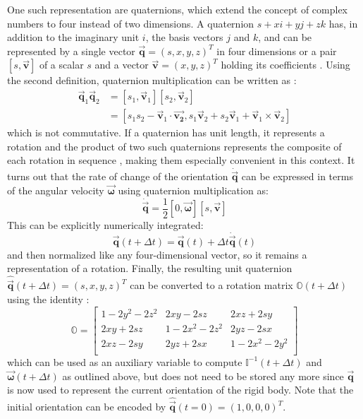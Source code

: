 \documentclass[oneside, a4paper]{book}
\newcommand\vek[1]{\vec{\bm{#1}}}
\newcommand\br[1]{\left(#1\right)}
\begin{document}
    One such representation are quaternions, which extend the concept of complex numbers to four instead of two dimensions. A quaternion $s + x i + y j + z k$ has, in addition to the imaginary unit $i$, the basis vectors $j$ and $k$, and can be represented by a single vector $\vek{q} = \br{s,x,y,z}^T$ in four dimensions or a pair $\left[s,\vek{v}\right]$ of a scalar $s$ and a vector $\vek{v}=\br{x,y,z}^T$ holding its coefficients \autocite{physically-based-rigids}. Using the second definition, quaternion multiplication can be written as \autocite{physically-based-rigids}:
    \begin{align}
      \vek{q}_1 \vek{q}_2 
      &= \left[s_1,\vek{v}_1\right] \left[s_2,\vek{v}_2\right] \\
      &= \left[s_1 s_2 - \vek{v}_1 \cdot \vek{v_2}, s_1\vek{v}_2 + s_2\vek{v}_1 + \vek{v}_1 \times \vek{v}_2 \right]
    \end{align}
    which is not commutative. If a quaternion has unit length, it represents a rotation and the product of two such quaternions represents the composite of each rotation in sequence \autocite{physically-based-rigids}, making them especially convenient in this context. It turns out that the rate of change of the orientation $\dot{\vek{q}}$ can be expressed in terms of the angular velocity $\vek{\omega}$ using quaternion multiplication as:
    \begin{equation}\label{eq:rigid-quaternion-qdot}
      \dot{\vek{q}} = \frac{1}{2} \left[0,\vek{\omega}\right]\left[s,\vek{v}\right] 
    \end{equation}
   This can be explicitly numerically integrated:
    \begin{equation}\label{eq:rigid-qdot-integration}
      \vek{q}\br{t+\Delta t} = \vek{q}\br{t} + \Delta t\dot{\vek{q}}\br{t}
    \end{equation}
    and then normalized like any four-dimensional vector, so it remains a representation of a rotation. Finally, the resulting unit quaternion $\hat{\vek{q}}\br{t+\Delta t}=\br{s,x,y,z}^T$ can be converted to a rotation matrix $\mathds{O}\br{t+\Delta t}$  using the identity \autocite{physically-based-rigids}:
    \begin{equation}\label{eq:rigid-quaternion-to-matrix}
      \mathds{O} = \begin{bmatrix}
        1-2y^2-2z^2 & 2xy-2sz & 2xz+2sy\\
        2xy+2sz & 1-2x^2-2z^2 & 2yz-2sx\\
        2xz-2sy & 2yz+2sx & 1-2x^2-2y^2\\
      \end{bmatrix}
    \end{equation}
    which can be used as an auxiliary variable to compute $\mathds{I}^{-1}\br{t+\Delta t}$ and $\vek{\omega}\br{t+\Delta t}$ as outlined above, but does not need to be stored any more since $\vek{q}$ is now used to represent the current orientation of the rigid body. Note that the initial orientation can be encoded by $\hat{\vek{q}}\br{t=0} = \br{1,0,0,0}^T$.
\end{document}
